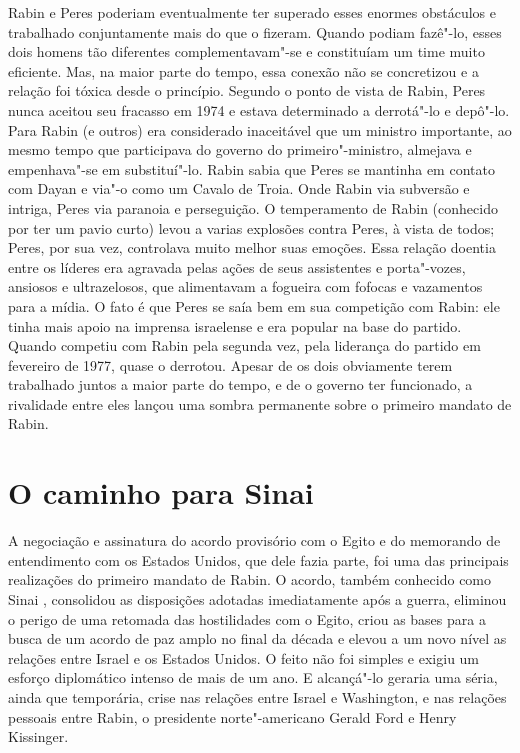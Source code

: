 Rabin e Peres poderiam eventualmente ter superado esses enormes
obstáculos e trabalhado conjuntamente mais do que o fizeram. Quando
podiam fazê"-lo, esses dois homens tão diferentes complementavam"-se e
constituíam um time muito eficiente. Mas, na maior parte do tempo, essa
conexão não se concretizou e a relação foi tóxica desde o princípio.
Segundo o ponto de vista de Rabin, Peres nunca aceitou seu fracasso em
1974 e estava determinado a derrotá"-lo e depô"-lo. Para Rabin (e outros)
era considerado inaceitável que um ministro importante, ao mesmo tempo
que participava do governo do primeiro"-ministro, almejava e empenhava"-se
em substituí"-lo. Rabin sabia que Peres se mantinha em contato com Dayan
e via"-o como um Cavalo de Troia. Onde Rabin via subversão e intriga,
Peres via paranoia e perseguição. O temperamento de Rabin (conhecido por
ter um pavio curto) levou a varias explosões contra Peres, à vista de
todos; Peres, por sua vez, controlava muito melhor suas emoções. Essa
relação doentia entre os líderes era agravada pelas ações de seus
assistentes e porta"-vozes, ansiosos e ultrazelosos, que alimentavam a
fogueira com fofocas e vazamentos para a mídia. O fato é que Peres se
saía bem em sua competição com Rabin: ele tinha mais apoio na imprensa
israelense e era popular na base do partido. Quando competiu com Rabin
pela segunda vez, pela liderança do partido em fevereiro de 1977, quase
o derrotou. Apesar de os dois obviamente terem trabalhado juntos a maior
parte do tempo, e de o governo ter funcionado, a rivalidade entre eles
lançou uma sombra permanente sobre o primeiro mandato de Rabin.

\section{O caminho para Sinai }

A negociação e assinatura do acordo provisório com o Egito e do
memorando de entendimento com os Estados Unidos, que dele fazia parte,
foi uma das principais realizações do primeiro mandato de Rabin. O
acordo, também conhecido como Sinai , consolidou as disposições
adotadas imediatamente após a guerra, eliminou o perigo de uma retomada
das hostilidades com o Egito, criou as bases para a busca de um acordo
de paz amplo no final da década e elevou a um novo nível as relações
entre Israel e os Estados Unidos. O feito não foi simples e exigiu um
esforço diplomático intenso de mais de um ano. E alcançá"-lo geraria uma
séria, ainda que temporária, crise nas relações entre Israel e
Washington, e nas relações pessoais entre Rabin, o presidente norte"-americano Gerald Ford e Henry Kissinger.

